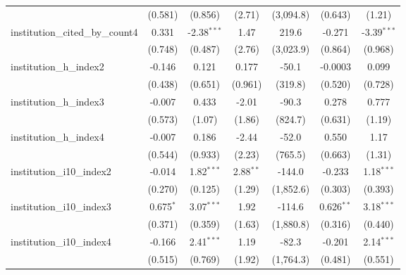 \begin{tabular}{lcccccc}
                                         & (0.581)        & (0.856)       & (2.71)        & (3,094.8)  & (0.643)       & (1.21)\\   
   institution\_cited\_by\_count4        & 0.331          & -2.38$^{***}$ & 1.47          & 219.6      & -0.271        & -3.39$^{***}$\\   
                                         & (0.748)        & (0.487)       & (2.76)        & (3,023.9)  & (0.864)       & (0.968)\\   
   institution\_h\_index2                & -0.146         & 0.121         & 0.177         & -50.1      & -0.0003       & 0.099\\   
                                         & (0.438)        & (0.651)       & (0.961)       & (319.8)    & (0.520)       & (0.728)\\   
   institution\_h\_index3                & -0.007         & 0.433         & -2.01         & -90.3      & 0.278         & 0.777\\   
                                         & (0.573)        & (1.07)        & (1.86)        & (824.7)    & (0.631)       & (1.19)\\   
   institution\_h\_index4                & -0.007         & 0.186         & -2.44         & -52.0      & 0.550         & 1.17\\   
                                         & (0.544)        & (0.933)       & (2.23)        & (765.5)    & (0.663)       & (1.31)\\   
   institution\_i10\_index2              & -0.014         & 1.82$^{***}$  & 2.88$^{**}$   & -144.0     & -0.233        & 1.18$^{***}$\\   
                                         & (0.270)        & (0.125)       & (1.29)        & (1,852.6)  & (0.303)       & (0.393)\\   
   institution\_i10\_index3              & 0.675$^{*}$    & 3.07$^{***}$  & 1.92          & -114.6     & 0.626$^{**}$  & 3.18$^{***}$\\   
                                         & (0.371)        & (0.359)       & (1.63)        & (1,880.8)  & (0.316)       & (0.440)\\   
   institution\_i10\_index4              & -0.166         & 2.41$^{***}$  & 1.19          & -82.3      & -0.201        & 2.14$^{***}$\\   
                                         & (0.515)        & (0.769)       & (1.92)        & (1,764.3)  & (0.481)       & (0.551)\\   

\end{tabular}
